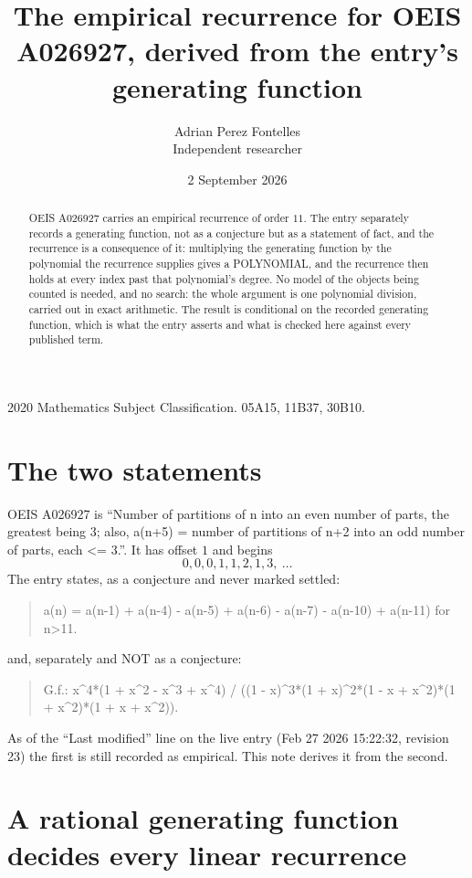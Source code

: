 \documentclass[11pt,a4paper]{article}
\title{The empirical recurrence for OEIS A026927, derived from the entry's generating function}
\author{Adrian Perez Fontelles\\ \small Independent researcher}
\date{2 September 2026}
\theoremstyle{plain}
\theoremstyle{definition}
\begin{document}
\maketitle

\begin{abstract}
OEIS A026927 carries an empirical recurrence of order $11$. The entry separately records a
generating function, not as a conjecture but as a statement of fact, and the recurrence is a
consequence of it: multiplying the generating function by the polynomial the recurrence
supplies gives a POLYNOMIAL, and the recurrence then holds at every index past that
polynomial's degree. No model of the objects being counted is needed, and no search: the
whole argument is one polynomial division, carried out in exact arithmetic. The result is
conditional on the recorded generating function, which is what the entry asserts and what is
checked here against every published term.
\end{abstract}

\noindent\small 2020 Mathematics Subject Classification. 05A15, 11B37, 30B10.\normalsize

\section{The two statements}

OEIS A026927 is ``Number of partitions of n into an even number of parts, the greatest being 3; also, a(n+5) = number of partitions of n+2 into an odd number of parts, each <= 3.''. It has offset $1$ and begins
\[
0, 0, 0, 1, 1, 2, 1, 3,\ \dots
\]
The entry states, as a conjecture and never marked settled:
\begin{quote}
a(n) = a(n-1) + a(n-4) - a(n-5) + a(n-6) - a(n-7) - a(n-10) + a(n-11) for n>11.
\end{quote}
and, separately and NOT as a conjecture:
\begin{quote}
G.f.: x\^{}4*(1 + x\^{}2 - x\^{}3 + x\^{}4) / ((1 - x)\^{}3*(1 + x)\^{}2*(1 - x + x\^{}2)*(1 + x\^{}2)*(1 + x + x\^{}2)).
\end{quote}
As of the ``Last modified'' line on the live entry (Feb 27 2026 15:22:32, revision 23) the first is still
recorded as empirical. This note derives it from the second.

\section{A rational generating function decides every linear recurrence}
\end{document}
